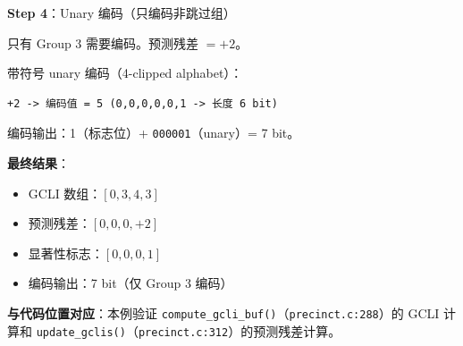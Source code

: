 \begin{examplebox}[title={例 2：GCLI 编码全流程}]
\textbf{Step 4}：Unary 编码（只编码非跳过组）

只有 Group 3 需要编码。预测残差 $= +2$。

带符号 unary 编码（4-clipped alphabet）：

\begin{lstlisting}[numbers=none]
+2 -> 编码值 = 5 (0,0,0,0,0,1 -> 长度 6 bit)
\end{lstlisting}

编码输出：1（标志位）+ \texttt{000001}（unary）= 7 bit。

\medskip
\textbf{最终结果}：
\begin{itemize}
  \item GCLI 数组：$[0, 3, 4, 3]$
  \item 预测残差：$[0, 0, 0, +2]$
  \item 显著性标志：$[0, 0, 0, 1]$
  \item 编码输出：7 bit（仅 Group 3 编码）
\end{itemize}

\medskip
\textbf{与代码位置对应}：本例验证 \texttt{compute\_gcli\_buf()}（\texttt{precinct.c:288}）的 GCLI 计算和 \texttt{update\_gclis()}（\texttt{precinct.c:312}）的预测残差计算。
\end{examplebox}

